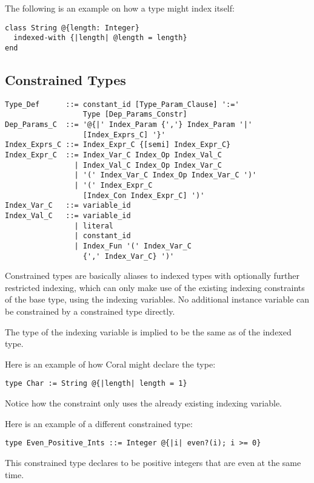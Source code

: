 \example The following is an example on how a  type might index itself: 
\begin{lstlisting}
class String @{length: Integer}
  indexed-with {|length| @length = length}
end
\end{lstlisting}

\subsection{Constrained Types}
\label{sec:constrained-types}

\syntax\begin{lstlisting}
Type_Def      ::= constant_id [Type_Param_Clause] ':=' 
                  Type [Dep_Params_Constr]
Dep_Params_C  ::= '@{|' Index_Param {','} Index_Param '|'
                  [Index_Exprs_C] '}'
Index_Exprs_C ::= Index_Expr_C {[semi] Index_Expr_C}
Index_Expr_C  ::= Index_Var_C Index_Op Index_Val_C
                | Index_Val_C Index_Op Index_Var_C
                | '(' Index_Var_C Index_Op Index_Var_C ')'
                | '(' Index_Expr_C 
                  [Index_Con Index_Expr_C] ')'
Index_Var_C   ::= variable_id
Index_Val_C   ::= variable_id
                | literal
                | constant_id
                | Index_Fun '(' Index_Var_C 
                  {',' Index_Var_C} ')'
\end{lstlisting}

Constrained types are basically aliases to indexed types with optionally further restricted indexing, which can only make use of the existing indexing constraints of the base type, using the indexing variables. No additional instance variable can be constrained by a constrained type directly. 

The type of the indexing variable is implied to be the same as of the indexed type. 

\example Here is an example of how Coral might declare the  type:
\begin{lstlisting}
type Char := String @{|length| length = 1}
\end{lstlisting}
Notice how the constraint only uses the already existing indexing variable. 

\example Here is an example of a different constrained type: 
\begin{lstlisting}
type Even_Positive_Ints ::= Integer @{|i| even?(i); i >= 0}
\end{lstlisting}
This constrained type declares  to be positive integers that are even at the same time. 

